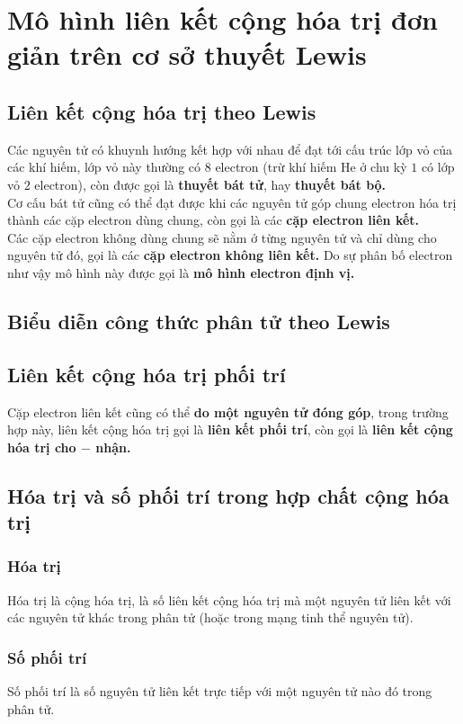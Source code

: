 \section{Mô hình liên kết cộng hóa trị đơn giản trên cơ sở thuyết Lewis}
\subsection{Liên kết cộng hóa trị theo Lewis}
Các nguyên tử có khuynh hướng kết hợp với nhau để đạt tới cấu trúc lớp vỏ của các khí hiếm, lớp vỏ này thường có $8$ electron (trừ khí hiếm $\mathrm{He}$ ở chu kỳ $1$ có lớp vỏ $2$ electron), còn được gọi là \textbf{thuyết bát tử}, hay \textbf{thuyết bát bộ.}\\
Cơ cấu bát tử cũng có thể đạt được khi các nguyên tử góp chung electron hóa trị thành các cặp electron dùng chung, còn gọi là các\textbf{ cặp electron liên kết.}\\
Các cặp electron không dùng chung sẽ nằm ở từng nguyên tử và chỉ dùng cho nguyên tử đó, gọi là các \textbf{cặp electron không liên kết.} Do sự phân bố electron như vậy mô hình này được gọi là \textbf{mô hình electron định vị.}
\subsection{Biểu diễn công thức phân tử theo Lewis}
\subsection{Liên kết cộng hóa trị phối trí}
Cặp electron liên kết cũng có thể \textbf{do một nguyên tử đóng góp}, trong trường hợp này, liên kết cộng hóa trị gọi là \textbf{liên kết phối trí}, còn gọi là \textbf{liên kết cộng hóa trị cho $\mathbf{-}$ nhận.}
\subsection{Hóa trị và số phối trí trong hợp chất cộng hóa trị}
\subsubsection{Hóa trị}
Hóa trị là cộng hóa trị, là số liên kết cộng hóa trị mà một nguyên tử liên kết với các nguyên tử khác trong phân tử (hoặc trong mạng tinh thể nguyên tử).
\subsubsection{Số phối trí}
Số phối trí là số nguyên tử liên kết trực tiếp với một nguyên tử nào đó trong phân tử.
